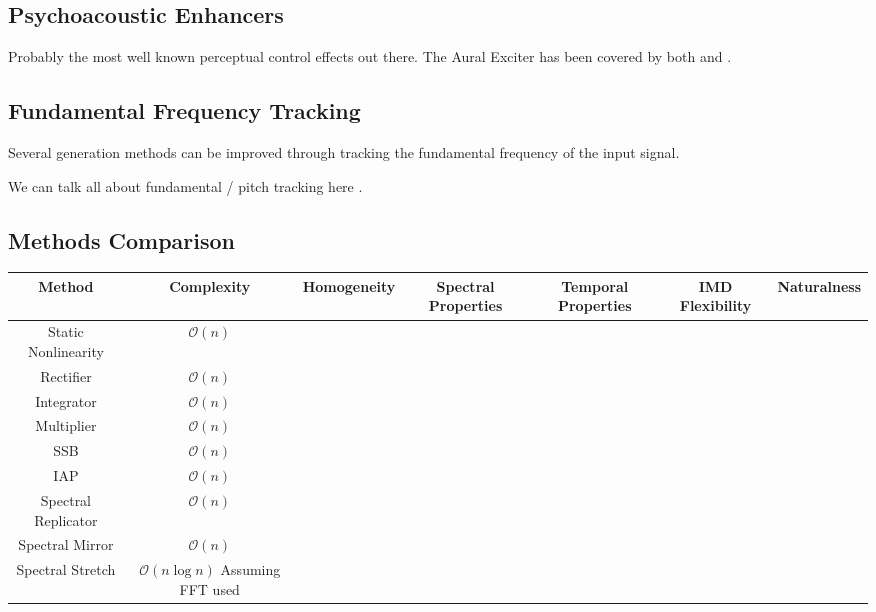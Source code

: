 	\subsection{Psychoacoustic Enhancers}
	\label{sec:Excitation-Enhancers}
		\note
		{
			Probably the most well known perceptual control effects out there. The Aural Exciter has been 
			covered by both \citet{chalupper2000aural} and \citet{shekar2013modeling}.
		}

	\subsection{Fundamental Frequency Tracking}
	\label{sec:Excitation-Fundamental}
		\note
		{
			Several generation methods can be improved through tracking the fundamental frequency of the input 
			signal.

			We can talk all about fundamental / pitch tracking here \citep{cuadra2001efficient, 
			gerhard2003pitch, prukkanon2009vt-amdf, larsen2004audio}.
		}

\begin{landscape}
\section{Methods Comparison}
\label{sec:Excitation-Comparison}

	\begin{tabular}{|c|c|c|c|c|c|c|}
		\hline
		\bf{Method} & \bf{Complexity} & \bf{Homogeneity} & \bf{Spectral Properties} & \bf{Temporal Properties} & \bf{IMD}
		\bf{Flexibility} & \bf{Naturalness} \\
		\hline
		Static Nonlinearity & $\mathcal{O}(n)$ & & & & & \\
		\hline
		Rectifier & $\mathcal{O}(n)$ & & & & & \\
		\hline
		Integrator & $\mathcal{O}(n)$ & & & & & \\
		\hline
		Multiplier & $\mathcal{O}(n)$ & & & & & \\
		\hline
		SSB & $\mathcal{O}(n)$ & & & & & \\
		\hline
		IAP & $\mathcal{O}(n)$ & & & & & \\
		\hline
		Spectral Replicator & $\mathcal{O}(n)$ & & & & & \\
		\hline
		Spectral Mirror & $\mathcal{O}(n)$ & & & & & \\
		\hline
		Spectral Stretch & $\mathcal{O}(n\log{n})$ Assuming FFT used & & & & & \\
		\hline
	\end{tabular}

\end{landscape}
